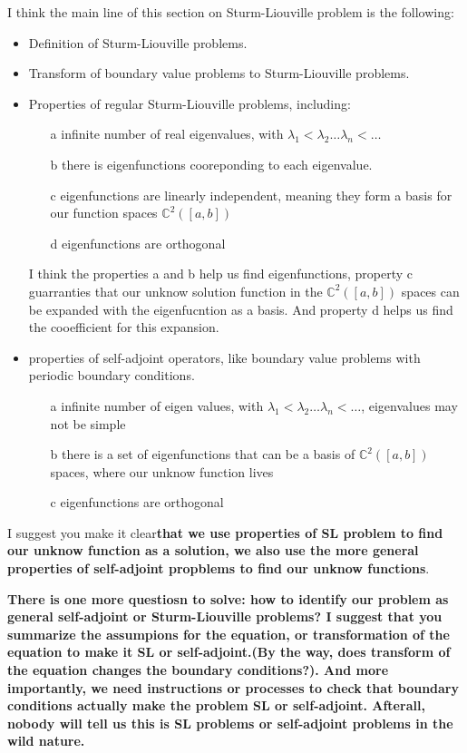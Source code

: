 \documentclass{article}
\begin{document}
I think the main line of this section on Sturm-Liouville problem is the following:
\begin{itemize}
\item Definition of Sturm-Liouville problems.
\item Transform of boundary value problems to Sturm-Liouville problems.
\item Properties of regular Sturm-Liouville problems, including:
\begin{enumerate}
\item[a] infinite number of real eigenvalues, with $\lambda_1 < \lambda_2 \ldots \lambda_n < \ldots$
\item[b] there is eigenfunctions cooreponding to each eigenvalue.
\item[c] eigenfunctions are linearly independent, meaning they form a basis for our function spaces $\mathbb{C}^{2}([a, b])$
\item[d] eigenfunctions are orthogonal 
\end{enumerate}

I think the properties a and b help us find eigenfunctions, property c guarranties that our unknow solution function in the $\mathbb{C}^{2}([a, b])$ spaces can be expanded with the eigenfucntion as a basis. And property d helps us find the cooefficient for this expansion. 
\item properties of self-adjoint operators, like boundary value problems with periodic boundary conditions.
\begin{enumerate}
\item[a] infinite number of eigen values, with $\lambda_1 < \lambda_2 \ldots \lambda_n < \ldots$, eigenvalues may not be simple
\item[b] there is a set of eigenfunctions that can be a basis of $\mathbb{C}^{2}([a, b])$ spaces, where our unknow function lives
\item[c] eigenfunctions are orthogonal
\end{enumerate}

\end{itemize}

I suggest you make it clear\textbf{that we use properties of SL problem to find our unknow function as a solution, we also use the more general properties of self-adjoint propblems to find our unknow functions}.

\color{red} \textbf{
There is one more questiosn to solve: how to identify our problem as general self-adjoint or Sturm-Liouville problems? I suggest that you summarize the assumpions for the equation, or transformation of the equation to make it SL or self-adjoint.(By the way, does transform of the equation changes the boundary conditions?). And more importantly, we need instructions or processes to check that boundary conditions actually make the problem SL or self-adjoint. Afterall, nobody will tell us this is SL problems or self-adjoint problems in the wild nature.}
\end{document}
